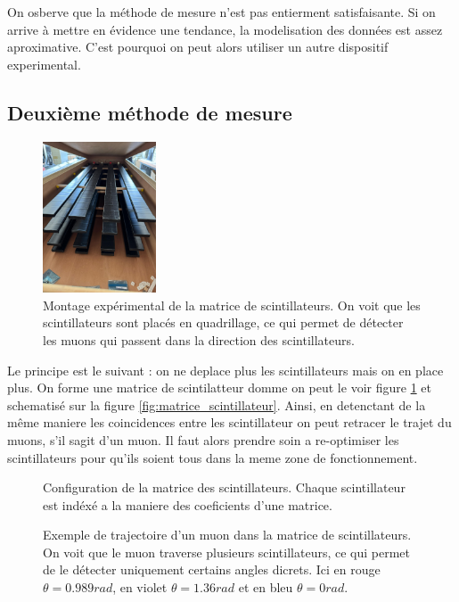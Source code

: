 \documentclass[a4paper,12pt,twoside]{article}
\begin{document}
On osberve que la méthode de mesure n'est pas entierment satisfaisante.
Si on arrive à mettre en évidence une tendance, la modelisation des données est assez aproximative.
C'est pourquoi on peut alors utiliser un autre dispositif experimental.

\subsection{Deuxième méthode de mesure}


\begin{figure}[!h]
  \centering
  \includegraphics[width=0.3\textwidth]{Images/matrice_scint.jpg}
  \caption{Montage expérimental de la matrice de scintillateurs. On voit que les scintillateurs sont placés en quadrillage, ce qui permet de détecter les muons qui passent dans la direction des scintillateurs.}
  \label{fig:scintillateur}
\end{figure}


Le principe est le suivant : on ne deplace plus les scintillateurs mais on en place plus. 
On forme une matrice de scintilatteur domme on peut le voir figure \ref{fig:scintillateur} et schematisé sur la figure \ref{fig:matrice_scintillateur}.
Ainsi, en detenctant de la même maniere les coincidences entre les scintillateur on peut retracer le trajet du muons, s'il sagit d'un muon. 
Il faut alors prendre soin a re-optimiser les scintillateurs pour qu'ils soient tous dans la meme zone de fonctionnement.

\begin{figure}[!h]
  \begin{minipage}
  {0.45\textwidth}
    \centering
    
    \caption{Configuration de la matrice des scintillateurs. Chaque scintillateur est indéxé a la maniere des coeficients d'une matrice.}
    \label{fig:matrice_scintillateur}
  \end{minipage}
  \hfill
  \begin{minipage}{0.45\textwidth}
    \centering
    
    \caption{Exemple de trajectoire d'un muon dans la matrice de scintillateurs.\\On voit que le muon traverse plusieurs scintillateurs, ce qui permet de le détecter uniquement certains angles dicrets. Ici en rouge $\theta = 0.989 rad$, en violet $\theta = 1.36 rad$ et en bleu $\theta = 0 rad$.}
    \label{fig:matrice_scintillateur_2}
  \end{minipage}
\end{figure}
\end{document}
